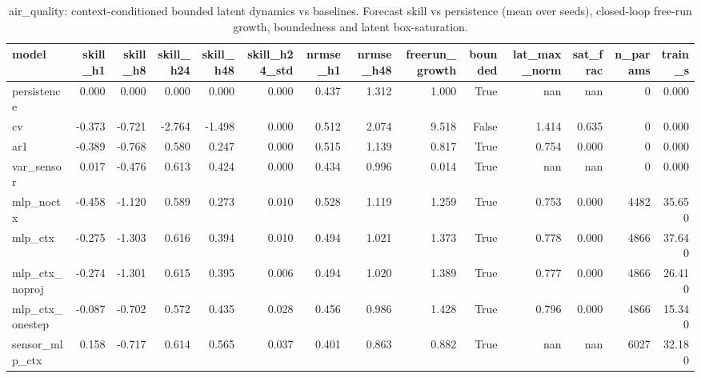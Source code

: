 \begin{table}[t]
\centering
\caption{air_quality: context-conditioned bounded latent dynamics vs baselines. Forecast skill vs persistence (mean over seeds), closed-loop free-run growth, boundedness and latent box-saturation.}
\label{tab:air_quality_latentdyn}
\begin{tabular}{lrrrrrrrrrrrrr}
\toprule
model & skill\_h1 & skill\_h8 & skill\_h24 & skill\_h48 & skill\_h24\_std & nrmse\_h1 & nrmse\_h48 & freerun\_growth & bounded & lat\_max\_norm & sat\_frac & n\_params & train\_s \\
\midrule
persistence & 0.000 & 0.000 & 0.000 & 0.000 & 0.000 & 0.437 & 1.312 & 1.000 & True & nan & nan & 0 & 0.000 \\
cv & -0.373 & -0.721 & -2.764 & -1.498 & 0.000 & 0.512 & 2.074 & 9.518 & False & 1.414 & 0.635 & 0 & 0.000 \\
ar1 & -0.389 & -0.768 & 0.580 & 0.247 & 0.000 & 0.515 & 1.139 & 0.817 & True & 0.754 & 0.000 & 0 & 0.000 \\
var\_sensor & 0.017 & -0.476 & 0.613 & 0.424 & 0.000 & 0.434 & 0.996 & 0.014 & True & nan & nan & 0 & 0.000 \\
mlp\_noctx & -0.458 & -1.120 & 0.589 & 0.273 & 0.010 & 0.528 & 1.119 & 1.259 & True & 0.753 & 0.000 & 4482 & 35.650 \\
mlp\_ctx & -0.275 & -1.303 & 0.616 & 0.394 & 0.010 & 0.494 & 1.021 & 1.373 & True & 0.778 & 0.000 & 4866 & 37.640 \\
mlp\_ctx\_noproj & -0.274 & -1.301 & 0.615 & 0.395 & 0.006 & 0.494 & 1.020 & 1.389 & True & 0.777 & 0.000 & 4866 & 26.410 \\
mlp\_ctx\_onestep & -0.087 & -0.702 & 0.572 & 0.435 & 0.028 & 0.456 & 0.986 & 1.428 & True & 0.796 & 0.000 & 4866 & 15.340 \\
sensor\_mlp\_ctx & 0.158 & -0.717 & 0.614 & 0.565 & 0.037 & 0.401 & 0.863 & 0.882 & True & nan & nan & 6027 & 32.180 \\
\bottomrule
\end{tabular}
\end{table}